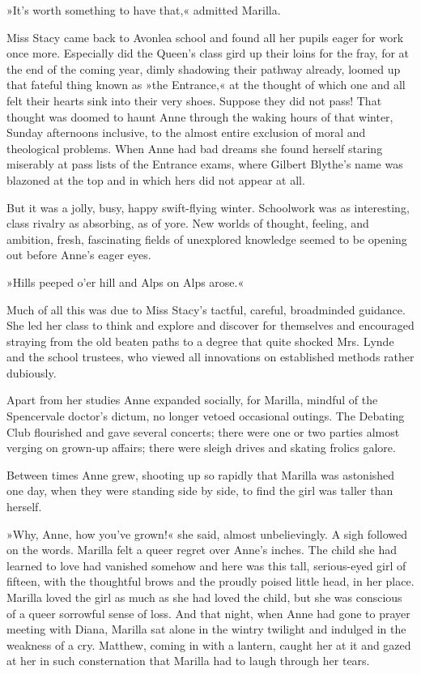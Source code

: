 »It’s worth something to have that,« admitted Marilla.

Miss Stacy came back to Avonlea school and found all her pupils eager for work once more. Especially did the Queen’s class gird up their loins for the fray, for at the end of the coming year, dimly shadowing their pathway already, loomed up that fateful thing known as »the Entrance,« at the thought of which one and all felt their hearts sink into their very shoes. Suppose they did not pass! That thought was doomed to haunt Anne through the waking hours of that winter, Sunday afternoons inclusive, to the almost entire exclusion of moral and theological problems. When Anne had bad dreams she found herself staring miserably at pass lists of the Entrance exams, where Gilbert Blythe’s name was blazoned at the top and in which hers did not appear at all.

But it was a jolly, busy, happy swift-flying winter. Schoolwork was as interesting, class rivalry as absorbing, as of yore. New worlds of thought, feeling, and ambition, fresh, fascinating fields of unexplored knowledge seemed to be opening out before Anne’s eager eyes.

»Hills peeped o’er hill and Alps on Alps arose.«

Much of all this was due to Miss Stacy’s tactful, careful, broadminded guidance. She led her class to think and explore and discover for themselves and encouraged straying from the old beaten paths to a degree that quite shocked Mrs. Lynde and the school trustees, who viewed all innovations on established methods rather dubiously.

Apart from her studies Anne expanded socially, for Marilla, mindful of the Spencervale doctor’s dictum, no longer vetoed occasional outings. The Debating Club flourished and gave several concerts; there were one or two parties almost verging on grown-up affairs; there were sleigh drives and skating frolics galore.

Between times Anne grew, shooting up so rapidly that Marilla was astonished one day, when they were standing side by side, to find the girl was taller than herself.

»Why, Anne, how you’ve grown!« she said, almost unbelievingly. A sigh followed on the words. Marilla felt a queer regret over Anne’s inches. The child she had learned to love had vanished somehow and here was this tall, serious-eyed girl of fifteen, with the thoughtful brows and the proudly poised little head, in her place. Marilla loved the girl as much as she had loved the child, but she was conscious of a queer sorrowful sense of loss. And that night, when Anne had gone to prayer meeting with Diana, Marilla sat alone in the wintry twilight and indulged in the weakness of a cry. Matthew, coming in with a lantern, caught her at it and gazed at her in such consternation that Marilla had to laugh through her tears.

